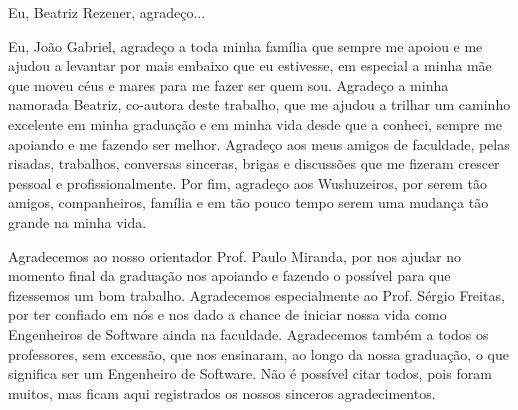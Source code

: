 \begin{agradecimentos}

Eu, Beatriz Rezener, agradeço...

Eu, João Gabriel, agradeço a toda minha família que sempre me apoiou e me ajudou a levantar por mais embaixo que eu estivesse, em especial a minha mãe que moveu céus e mares para me fazer ser quem sou.
Agradeço a minha namorada Beatriz, co-autora deste trabalho, que me ajudou a trilhar um caminho excelente em minha graduação e em minha vida desde que a conheci, sempre me apoiando e me fazendo ser melhor.
Agradeço aos meus amigos de faculdade, pelas risadas, trabalhos, conversas sinceras, brigas e discussões que me fizeram crescer pessoal e profissionalmente.
Por fim, agradeço aos Wushuzeiros, por serem tão amigos, companheiros, família e em tão pouco tempo serem uma mudança tão grande na minha vida.

Agradecemos ao nosso orientador Prof. Paulo Miranda, por nos ajudar no momento final da graduação nos apoiando e fazendo o possível para que fizessemos um bom trabalho.
Agradecemos especialmente ao Prof. Sérgio Freitas, por ter confiado em nós e nos dado a chance de iniciar nossa vida como Engenheiros de Software ainda na faculdade.
Agradecemos também a todos os professores, sem excessão, que nos ensinaram, ao longo da nossa graduação, o que significa ser um Engenheiro de Software. Não é possível citar todos, 
pois foram muitos, mas ficam aqui registrados os nossos sinceros agradecimentos.

\end{agradecimentos}
